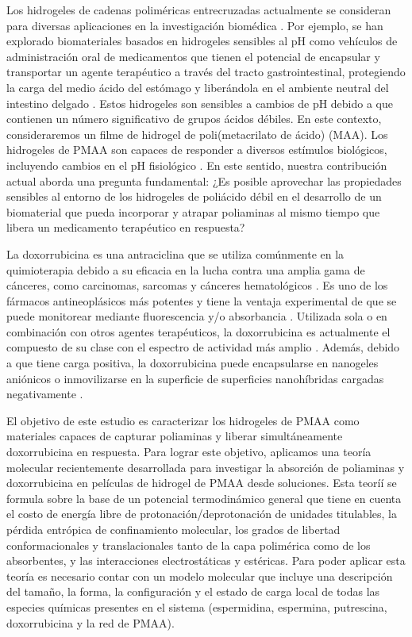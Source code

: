 Los hidrogeles de cadenas polim\'ericas entrecruzadas actualmente se consideran para diversas aplicaciones en la investigaci\'on biom\'edica \addcite[Wang2019].
Por ejemplo, se han explorado biomateriales basados en hidrogeles sensibles al pH como veh\'iculos de administraci\'on oral de medicamentos que tienen el potencial de encapsular y transportar un agente terap\'eutico a trav\'es del tracto gastrointestinal, protegiendo la carga del medio \'acido del est\'omago y liber\'andola en el ambiente neutral del intestino delgado .
Estos hidrogeles son sensibles a cambios de pH debido a que contienen un n\'umero significativo de grupos \'acidos d\'ebiles.
En este contexto, consideraremos un filme de hidrogel de poli(metacrilato de \'acido) (MAA).
Los hidrogeles de PMAA son capaces de responder a diversos est\'imulos biol\'ogicos, incluyendo cambios en el pH fisiol\'ogico .
En este sentido, nuestra contribuci\'on actual aborda una pregunta fundamental: ¿Es posible aprovechar las propiedades sensibles al entorno de los hidrogeles de poli\'acido d\'ebil en el desarrollo de un biomaterial que pueda incorporar y atrapar poliaminas al mismo tiempo que libera un medicamento terap\'eutico en respuesta?

La doxorrubicina es una antraciclina que se utiliza com\'unmente en la quimioterapia debido a su eficacia en la lucha contra una amplia gama de c\'anceres, como carcinomas, sarcomas y c\'anceres hematol\'ogicos \addcite[Panis2012].
Es uno de los f\'armacos antineopl\'asicos más potentes y tiene la ventaja experimental de que se puede monitorear mediante fluorescencia y/o absorbancia .
Utilizada sola o en combinaci\'on con otros agentes terap\'euticos, la doxorrubicina es actualmente el compuesto de su clase con el espectro de actividad m\'as amplio \addcite[Carvalho2009].
Adem\'as, debido a que tiene carga positiva, la doxorrubicina puede encapsularse en nanogeles ani\'onicos \addcite[Li2019] o inmovilizarse en la superficie de superficies nanoh\'ibridas cargadas negativamente \addcite[Kazempour2019].

El objetivo de este estudio es caracterizar los hidrogeles de PMAA como materiales capaces de capturar poliaminas y liberar simult\'aneamente doxorrubicina en respuesta.
Para lograr este objetivo, aplicamos una teor\'ia molecular recientemente desarrollada para investigar la absorci\'on de poliaminas y doxorrubicina en pel\'iculas de hidrogel de PMAA desde soluciones.
Esta teorí\'i se formula sobre la base de un potencial termodin\'amico general que tiene en cuenta el costo de energ\'ia libre de protonaci\'on/deprotonaci\'on de unidades titulables, la p\'erdida entr\'opica de confinamiento molecular, los grados de libertad conformacionales y translacionales tanto de la capa polim\'erica como de los absorbentes, y las interacciones electrost\'aticas y est\'ericas.
Para poder aplicar esta teor\'ia es necesario contar con un modelo molecular que incluye una descripci\'on del tama\~no, la forma, la configuraci\'on y el estado de carga local de todas las especies qu\'imicas presentes en el sistema (espermidina, espermina, putrescina, doxorrubicina y la red de PMAA).


